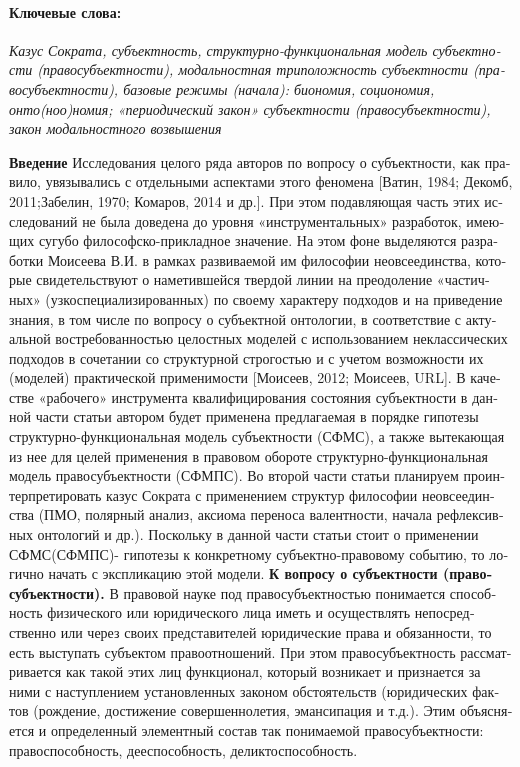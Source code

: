 \begin{russian}
    \paragraph{Ключевые слова:} {\itshape Казус Сократа, субъектность, структурно-функциональная модель субъектности (правосубъектности), модальностная триположность субъектности (правосубъектности), базовые режимы (начала): биономия, социономия, онто(ноо)номия; «периодический закон» субъектности (правосубъектности), закон модальностного возвышения}

    \textbf{Введение}
    Исследования целого ряда авторов по вопросу о субъектности, как правило, увязывались с отдельными аспектами этого феномена [Ватин, 1984; Декомб, 2011;Забелин, 1970; Комаров, 2014 и др.]. При этом подавляющая часть этих исследований не была доведена до уровня «инструментальных» разработок, имеющих сугубо философско-прикладное значение. На этом фоне выделяются разработки Моисеева В.И. в рамках развиваемой им философии неовсеединства, которые свидетельствуют о наметившейся твердой линии на преодоление «частичных» (узкоспециализированных) по своему характеру подходов и на приведение знания, в том числе по вопросу о субъектной онтологии, в соответствие с актуальной востребованностью целостных моделей с использованием неклассических подходов в сочетании со структурной строгостью и с учетом возможности их (моделей) практической применимости [Моисеев, 2012; Моисеев, URL].
    В качестве «рабочего» инструмента квалифицирования состояния субъектности в данной части статьи автором будет применена предлагаемая в порядке гипотезы структурно-функциональная модель субъектности (СФМС), а также вытекающая из нее для целей применения в правовом обороте структурно-функциональная модель правосубъектности (СФМПС). Во второй части статьи планируем проинтерпретировать казус Сократа с применением структур философии неовсеединства (ПМО, полярный анализ, аксиома переноса валентности, начала рефлексивных онтологий и др.).
    Поскольку в данной части статьи стоит о применении СФМС(СФМПС)- гипотезы к конкретному субъектно-правовому событию, то логично начать с экспликацию этой модели. 
    \textbf{К вопросу о субъектности (правосубъектности).}
    В правовой науке под правосубъектностью понимается способность физического или юридического лица иметь и осуществлять непосредственно или через своих представителей юридические права и обязанности, то есть выступать субъектом правоотношений. При этом правосубъектность рассматривается как  такой этих лиц функционал, который возникает и признается за ними с наступлением установленных законом обстоятельств (юридических фактов (рождение, достижение совершеннолетия, эмансипация и т.д.). Этим  объясняется и определенный элементный состав так понимаемой правосубъектности: правоспособность, дееспособность, деликтоспособность. 

\end{russian}
